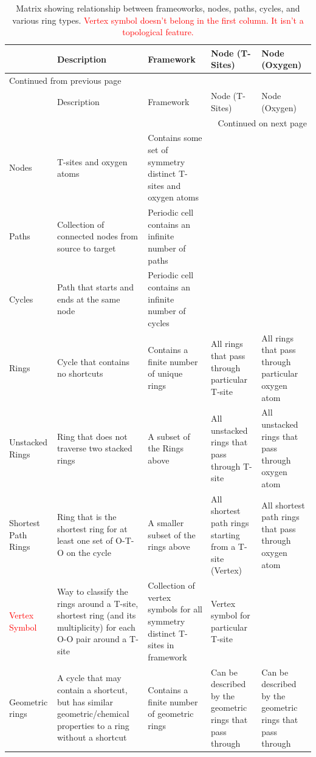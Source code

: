 \documentclass[11pt]{article}
\newcommand{\red}[1]{\textcolor{red}{#1}}
\begin{document}
\begin{longtable}{l p{2.7cm} p{2.7cm} p{2.7cm} p{2.7cm}}
\caption{Matrix showing relationship between frameoworks, nodes, paths, cycles, and various ring types. \red{Vertex symbol doesn't belong in the first column. It isn't a topological feature.} \label{tab:ring-def}}
\\
 & Description & Framework & Node (T-Sites) & Node (Oxygen)\\
\hline
\endfirsthead
\multicolumn{5}{l}{Continued from previous page} \\
\hline

 & Description & Framework & Node (T-Sites) & Node (Oxygen) \\

\hline
\endhead
\hline\multicolumn{5}{r}{Continued on next page} \\
\endfoot
\endlastfoot
\hline
Nodes & T-sites and oxygen atoms & Contains some set of symmetry distinct T-sites and oxygen atoms &  & \\
Paths & Collection of connected nodes from source to target & Periodic cell contains an infinite number of paths &  & \\
Cycles & Path that starts and ends at the same node & Periodic cell contains an infinite number of cycles &  & \\
Rings & Cycle that contains no shortcuts & Contains a finite number of unique rings & All rings that pass through particular T-site & All rings that pass through particular oxygen atom\\
Unstacked Rings & Ring that does not traverse two stacked rings & A subset of the Rings above & All unstacked rings that pass through T-site & All unstacked rings that pass through oxygen atom\\
Shortest Path Rings & Ring that is the shortest ring for at least one set of O-T-O on the cycle & A smaller subset of the rings above & All shortest path rings starting from a T-site (Vertex) & All shortest path rings that pass through oxygen atom\\
\red{Vertex Symbol} & Way to classify the rings around a T-site, shortest ring (and its multiplicity) for each O-O pair around a T-site & Collection of vertex symbols for all symmetry distinct T-sites in framework & Vertex symbol for particular T-site & \\
Geometric rings & A cycle that may contain a shortcut, but has similar geometric/chemical properties to a ring without a shortcut & Contains a finite number of geometric rings & Can be described by the geometric rings that pass through & Can be described by the geometric rings that pass through\\
\end{longtable}
\end{document}
